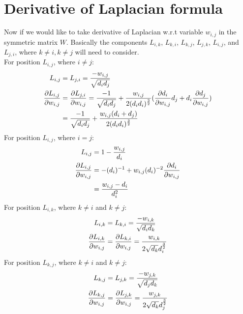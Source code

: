 \documentclass[final]{siamltexmm}
\begin{document}
\section{Derivative of Laplacian formula}
Now if we would like to take derivative of Laplacian w.r.t variable $w_{i,j}$ in the symmetric matrix $W$. Basically the components $L_{i,k}$, $L_{k,i}$, $L_{k,j}$, $L_{j,k}$, $L_{i,j}$, and $L_{j,i}$, where $k \neq i, k \neq j$ will need to consider. \\
For position $L_{i,j}$, where $i \neq j$:
\begin{equation}
\begin{aligned}
L_{i,j} &= L_{j,i} =  {-w_{i,j} \over \sqrt{d_id_j}} \\
{\partial L_{i,j} \over \partial w_{i,j}} &= {\partial L_{j,i} \over \partial w_{i,j}} = {-1 \over \sqrt{d_id_j}} + {w_{i,j} \over 2(d_id_i)^{3\over 2}}({\partial d_i \over \partial w_{i,j}}d_j + d_i{\partial d_j \over \partial w_{i,j}}) \\
&= {-1 \over \sqrt{d_id_j}} + {w_{i,j}(d_i+d_j) \over 2(d_id_i)^{3\over 2}}
\end{aligned}
\end{equation}
For position $L_{i,j}$, where $i = j$:
\begin{equation}
\begin{aligned}
L_{i,j} &=  1 - {w_{i,j} \over d_i} \\
{\partial L_{i,j} \over \partial w_{i,j}} &= -(d_i)^{-1} + w_{i,j}(d_i)^{-2}{\partial d_i\over \partial w_{i,j}} \\
&= {w_{i,j}-d_i \over d_i^2}
\end{aligned}
\end{equation}
For position $L_{i,k}$, where $k \neq i$ and $k \neq j$:
\begin{equation}
\begin{aligned}
L_{i,k} &= L_{k,i} =  {-w_{i,k} \over \sqrt{d_id_k}} \\
{\partial L_{i,k} \over \partial w_{i,j}} &= {\partial L_{k,i} \over \partial w_{i,j}} = {w_{i,k} \over 2\sqrt{d_k}d_i^{3\over2}}
\end{aligned}
\end{equation}
For position $L_{k,j}$, where $k \neq i$ and $k \neq j$:
\begin{equation}
\begin{aligned}
L_{k,j} &= L_{j,k} =  {-w_{j,k} \over \sqrt{d_jd_k}} \\
{\partial L_{k,j} \over \partial w_{i,j}} &= {\partial L_{j,k} \over \partial w_{i,j}} = {w_{j,k} \over 2\sqrt{d_k}d_j^{3\over2}}
\end{aligned}
\end{equation}
\end{document}
